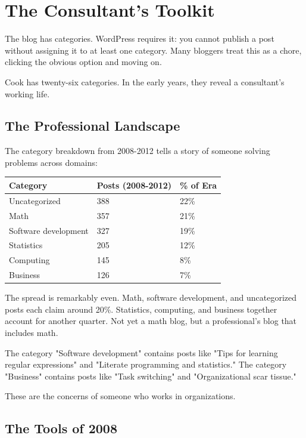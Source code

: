 \chapter{The Consultant's Toolkit}

The blog has categories. WordPress requires it: you cannot publish a post without assigning it to at least one category. Many bloggers treat this as a chore, clicking the obvious option and moving on.

Cook has twenty-six categories. In the early years, they reveal a consultant's working life.

\bigskip

\section*{The Professional Landscape}

The category breakdown from 2008-2012 tells a story of someone solving problems across domains:

\begin{longtable}{p{3.00cm}p{3.00cm}p{3.00cm}}
\toprule
\textbf{Category} & \textbf{Posts (2008-2012)} & \textbf{\% of Era} \tabularnewline
\midrule
Uncategorized & 388 & 22\% \tabularnewline
Math & 357 & 21\% \tabularnewline
Software development & 327 & 19\% \tabularnewline
Statistics & 205 & 12\% \tabularnewline
Computing & 145 & 8\% \tabularnewline
Business & 126 & 7\% \tabularnewline
\bottomrule
\end{longtable}

The spread is remarkably even. Math, software development, and uncategorized posts each claim around 20\%. Statistics, computing, and business together account for another quarter. Not yet a math blog, but a professional's blog that includes math.

The category "Software development" contains posts like "Tips for learning regular expressions" and "Literate programming and statistics." The category "Business" contains posts like "Task switching" and "Organizational scar tissue."

These are the concerns of someone who works in organizations.


\bigskip

\section*{The Tools of 2008}

